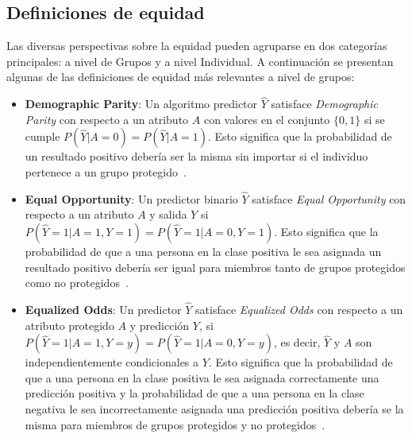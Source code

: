 \subsection{Definiciones de equidad}
Las diversas perspectivas sobre la equidad pueden agruparse en dos categor\'ias principales: a nivel de Grupos y a nivel Individual. 
A continuaci\'on se presentan algunas de las definiciones de equidad m\'as relevantes a nivel de grupos:

\begin{itemize}
    \item \textbf{Demographic Parity}: Un algoritmo predictor $\hat{Y}$ satisface \textit{Demographic Parity}
    con respecto a un atributo $A$ con valores en el conjunto $\{0,1\}$ si se cumple $P(\hat{Y} | A = 0) = P(\hat{Y} | A = 1)$. 
    Esto significa que la probabilidad de un resultado positivo debería ser la misma sin importar si el individuo pertenece a
    un grupo protegido~\parencite{fairness_def}.

    \item \textbf{Equal Opportunity}: Un predictor binario $\hat{Y}$ satisface \textit{Equal Opportunity} con 
    respecto a un atributo $A$ y salida $Y$ si $P(\hat{Y} = 1 | A = 1, Y = 1) = P(\hat{Y} = 1 | A = 0, Y = 1)$. Esto significa
    que la probabilidad de que a una persona en la clase positiva le sea asignada un resultado positivo 
    deber\'ia ser igual para miembros tanto de grupos protegidos como no protegidos~\parencite{fairness_def}.

    \item \textbf{Equalized Odds}: Un predictor $\hat{Y}$ satisface \textit{Equalized Odds} con respecto a un atributo
    protegido $A$ y predicci\'on $Y$, si $P(\hat{Y} = 1 | A = 1, Y = y) = P(\hat{Y} = 1 | A = 0, Y = y)$, es decir,
    $\hat{Y}$ y $A$ son independientemente condicionales a $Y$. Esto significa que la probabilidad de que a una persona 
    en la clase positiva le sea asignada correctamente una predicci\'on positiva y la probabilidad de que a una persona en la 
    clase negativa le sea incorrectamente asignada una predicci\'on positiva deber\'ia se la misma para miembros de grupos 
    protegidos y no protegidos~\parencite{fairness_def}.
\end{itemize}



